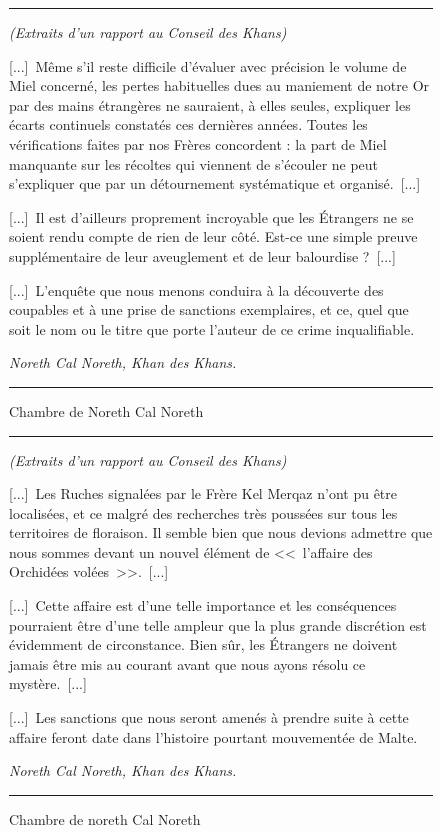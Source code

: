 \documentclass{article}
\newcommand{\indice}[4]{
    \begin{figure}[H]
        \begin{center}
            \rule{0.5\textwidth}{1pt}
        \end{center}
        \begin{framed}
            \begin{samepage}
                \textit{#1}
                \nopagebreak

                #2

                \nopagebreak

                \hfill\textit{#3}
            \end{samepage}
        \end{framed}
        \caption{#4}
        \begin{center}
            \rule{0.5\textwidth}{1pt}
        \end{center}
    \end{figure}
}
\begin{document}
\indice
{(Extraits d’un rapport au Conseil des Khans)}
{[...]~Même s’il reste difficile d’évaluer avec précision le volume de Miel
concerné, les pertes habituelles dues au maniement de notre Or par des mains
étrangères ne sauraient, à elles seules, expliquer les écarts continuels
constatés ces dernières années. Toutes les vérifications faites par nos Frères
concordent : la part de Miel manquante sur les récoltes qui viennent de
s’écouler ne peut s’expliquer que par un détournement systématique et
organisé.~[...]

\nobreak

[...]~Il est d’ailleurs proprement incroyable que les Étrangers ne se soient
rendu compte de rien de leur côté. Est-ce une simple preuve supplémentaire de
leur aveuglement et de leur balourdise ?~[...]

\nobreak

[...]~L’enquête que nous menons conduira à la découverte des coupables et à une
prise de sanctions exemplaires, et ce, quel que soit le nom ou le titre que
porte l’auteur de ce crime inqualifiable.}
{Noreth Cal Noreth, Khan des Khans.}
{Chambre de Noreth Cal Noreth}

\indice
{(Extraits d’un rapport au Conseil des Khans)}
{[...]~Les Ruches signalées par le Frère Kel Merqaz n’ont pu être localisées,
et ce malgré des recherches très poussées sur tous les territoires de
floraison. Il semble bien que nous devions admettre que nous sommes devant un
nouvel élément de <<~l’affaire des Orchidées volées~>>.~[...]

\nobreak

[...]~Cette affaire est d’une telle importance et les conséquences pourraient
être d’une telle ampleur que la plus grande discrétion est évidemment de
circonstance. Bien sûr, les Étrangers ne doivent jamais être mis au courant
avant que nous ayons résolu ce mystère.~[...]

\nobreak

[...]~Les sanctions que nous seront amenés à prendre suite à cette affaire
feront date dans l’histoire pourtant mouvementée de Malte.}
{Noreth Cal Noreth, Khan des Khans.}
{Chambre de noreth Cal Noreth}
\end{document}
